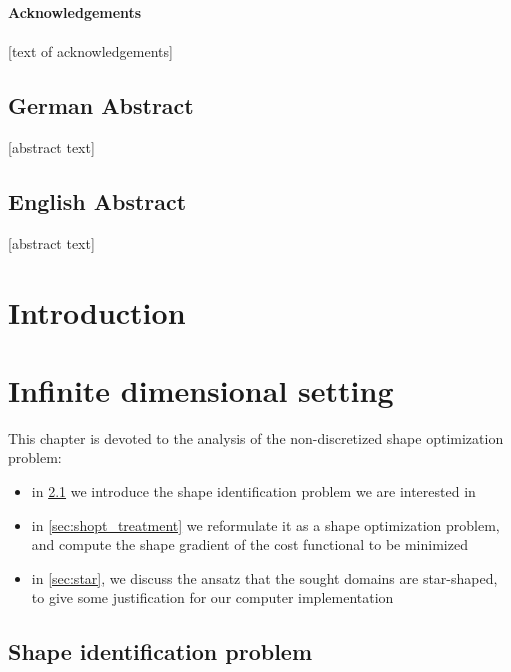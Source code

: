 \documentclass[english,a4paper,9pt,oneside]{scrbook}	%
\theoremstyle{break}
\theoremstyle{remark}
\begin{document}
\vspace*{2.2cm}
\noindent %
{\Huge \textbf{Acknowledgements}} \\
\vspace*{1.6cm} \\
\pagestyle{headings}
[text of acknowledgements]

\newpage
\section*{German Abstract}
[abstract text]
\section*{English Abstract}
[abstract text]
\newpage
\tableofcontents  


\chapter{Introduction}  \setcounter{page}{1}   %



\chapter{Infinite dimensional setting}
\label{chap:cts_shape_opt}

This chapter is devoted to the analysis of the non-discretized shape optimization problem:

\begin{itemize}
	\item in \cref{sec:shid} we introduce the shape identification problem we are interested in
	\item in \cref{sec:shopt_treatment} we reformulate it as a shape optimization problem, and compute the shape gradient of the cost functional to be minimized
	\item in \cref{sec:star}, we discuss the ansatz that the sought domains are star-shaped, to give some justification for our computer implementation
\end{itemize}

\section{Shape identification problem}
\label{sec:shid}
\end{document}
